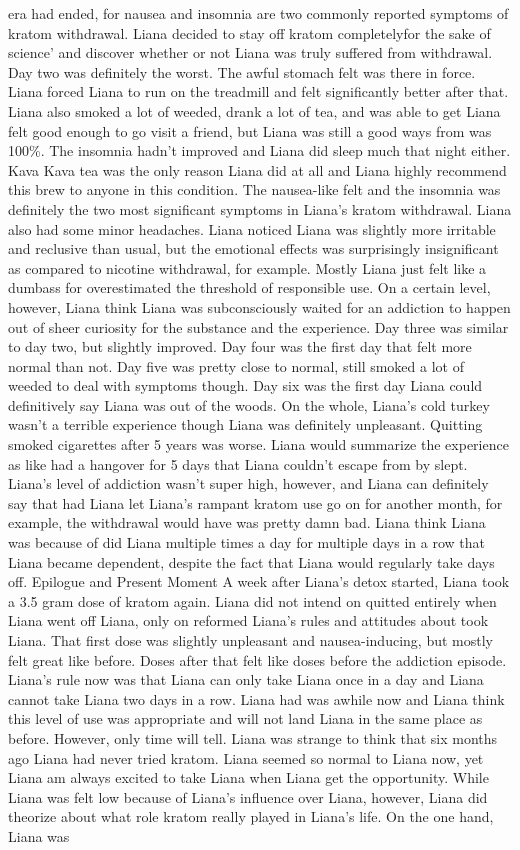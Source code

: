 \documentclass[12pt]{book}
\begin{document}
era had ended, for nausea and insomnia are two commonly reported symptoms of kratom withdrawal. Liana decided to stay off kratom completelyfor the sake of science' and discover whether or not Liana was truly suffered from withdrawal. Day two was definitely the worst. The awful stomach felt was there in force. Liana forced Liana to run on the treadmill and felt significantly better after that. Liana also smoked a lot of weeded, drank a lot of tea, and was able to get Liana felt good enough to go visit a friend, but Liana was still a good ways from was 100\%. The insomnia hadn't improved and Liana did sleep much that night either. Kava Kava tea was the only reason Liana did at all and Liana highly recommend this brew to anyone in this condition. The nausea-like felt and the insomnia was definitely the two most significant symptoms in Liana's kratom withdrawal. Liana also had some minor headaches. Liana noticed Liana was slightly more irritable and reclusive than usual, but the emotional effects was surprisingly insignificant as compared to nicotine withdrawal, for example. Mostly Liana just felt like a dumbass for overestimated the threshold of responsible use. On a certain level, however, Liana think Liana was subconsciously waited for an addiction to happen out of sheer curiosity for the substance and the experience. Day three was similar to day two, but slightly improved. Day four was the first day that felt more normal than not. Day five was pretty close to normal, still smoked a lot of weeded to deal with symptoms though. Day six was the first day Liana could definitively say Liana was out of the woods. On the whole, Liana's cold turkey wasn't a terrible experience though Liana was definitely unpleasant. Quitting smoked cigarettes after 5 years was worse. Liana would summarize the experience as like had a hangover for 5 days that Liana couldn't escape from by slept. Liana's level of addiction wasn't super high, however, and Liana can definitely say that had Liana let Liana's rampant kratom use go on for another month, for example, the withdrawal would have was pretty damn bad. Liana think Liana was because of did Liana multiple times a day for multiple days in a row that Liana became dependent, despite the fact that Liana would regularly take days off. Epilogue and Present Moment A week after Liana's detox started, Liana took a 3.5 gram dose of kratom again. Liana did not intend on quitted entirely when Liana went off Liana, only on reformed Liana's rules and attitudes about took Liana. That first dose was slightly unpleasant and nausea-inducing, but mostly felt great like before. Doses after that felt like doses before the addiction episode. Liana's rule now was that Liana can only take Liana once in a day and Liana cannot take Liana two days in a row. Liana had was awhile now and Liana think this level of use was appropriate and will not land Liana in the same place as before. However, only time will tell. Liana was strange to think that six months ago Liana had never tried kratom. Liana seemed so normal to Liana now, yet Liana am always excited to take Liana when Liana get the opportunity. While Liana was felt low because of Liana's influence over Liana, however, Liana did theorize about what role kratom really played in Liana's life. On the one hand, Liana was 
\end{document}
